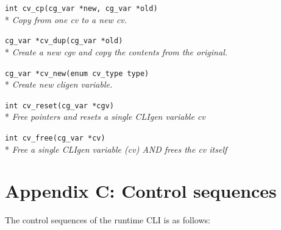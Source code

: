 \documentclass[a4paper, 10pt] {article}
\begin{document}
{{\tt int cv\_cp(cg\_var *new, cg\_var *old)}\\*
\emph{ Copy from one cv to a new cv.}

{\tt cg\_var *cv\_dup(cg\_var *old)}\\*
\emph{ Create a new cgv and copy the contents from the original. }

{\tt cg\_var *cv\_new(enum cv\_type type)}\\*
\emph{ Create new cligen variable. }

{\tt int cv\_reset(cg\_var *cgv)}\\*
\emph{ Free pointers and resets a single CLIgen variable cv}

{\tt int cv\_free(cg\_var *cv)}\\*
\emph{ Free a single CLIgen variable (cv) AND frees the cv itself}

\normalsize





\newpage
\section*{Appendix C: Control sequences}
\label{app:control}
The control sequences of the runtime CLI is as follows:


}
\end{document}
